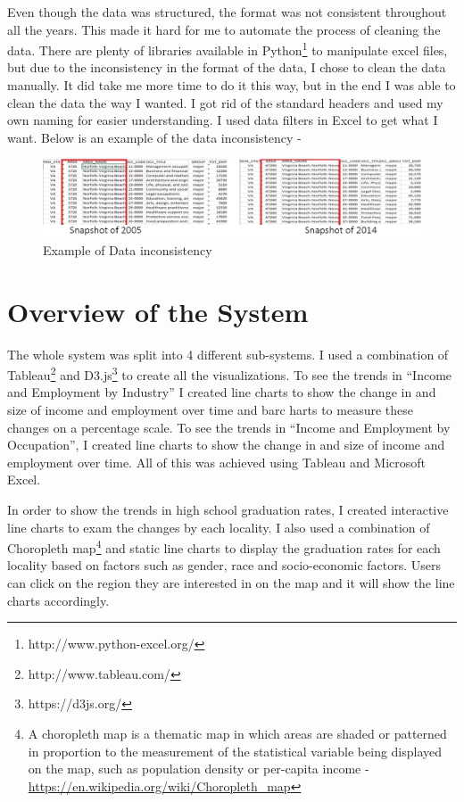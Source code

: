 \documentclass[12pt]{article}
\begin{document}
Even though the data was structured, the format was not consistent throughout all the years. This made it hard for me to automate the process of cleaning the data. There are plenty of libraries available in Python\footnote[1]{http://www.python-excel.org/} to manipulate excel files, but due to the inconsistency in the format of the data, I chose to clean the data manually. It did take me more time to do it this way, but in the end I was able to clean the data the way I wanted. I got rid of the standard headers and used my own naming for easier understanding. I used data filters in Excel to get what I want. Below is an example of the data inconsistency - \\

\begin{figure}[htp]
\centering
\includegraphics[scale = 0.5]{DATA.png}
\caption{Example of Data inconsistency}
\label{highq}
\end{figure}

\newpage

\section{Overview of the System}

The whole system was split into 4 different sub-systems. I used a combination of Tableau\footnote[2]{http://www.tableau.com/} and D3.js\footnote[3]{https://d3js.org/} to create all the visualizations. To see the trends in ``Income and Employment by Industry'' I created line charts to show the change in and size of income and employment over time and barc harts to measure these changes on a percentage scale. To see the trends in ``Income and Employment by Occupation'', I created line charts to show the change in and size of income and employment over time. All of this was achieved using Tableau and Microsoft Excel. 

In order to show the trends in high school graduation rates, I created interactive line charts to exam the changes by each locality. I also used a combination of Choropleth map\footnote[4]{A choropleth map is a thematic map in which areas are shaded or patterned in proportion to the measurement of the statistical variable being displayed on the map, such as population density or per-capita income - \url{https://en.wikipedia.org/wiki/Choropleth_map}} and static line charts to display the graduation rates for each locality based on factors such as gender, race and socio-economic factors. Users can click on the region they are interested in on the map and it will show the line charts accordingly. 
\end{document}

